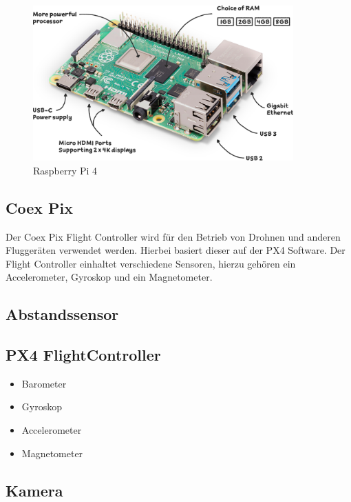 \begin{figure}[htbp]
    \centering
    \includegraphics[width=10cm,keepaspectratio,angle=0]{images/raspberry-pi-4-labelled.png}
    \caption[Raspberry Pi 4]{\label{img raspberry_pi} Raspberry Pi 4 \cite{imgraspberrypi}}
\end{figure}

\FloatBarrier

\subsection{Coex Pix} \label{coex_pix:subsection}
Der Coex Pix Flight Controller wird für den Betrieb von Drohnen und anderen Fluggeräten verwendet werden. Hierbei basiert dieser auf der PX4 Software. Der Flight Controller einhaltet verschiedene Sensoren, hierzu gehören ein Accelerometer, Gyroskop und ein Magnetometer.


\subsection{Abstandssensor}

\subsection{PX4 FlightController}

\begin{itemize}
    \item{Barometer}
    \item{Gyroskop}
    \item{Accelerometer}
    \item{Magnetometer}
\end{itemize}

\subsection{Kamera}

